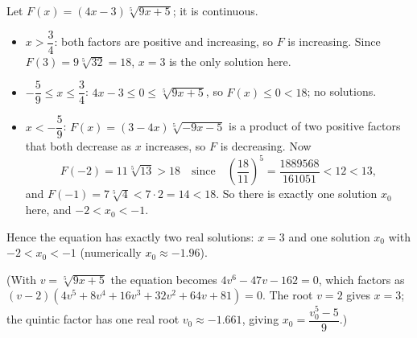 Let $F(x)=(4x-3)\sqrt[5]{9x+5}$; it is continuous.
\begin{itemize}
\item $x>\dfrac34$: both factors are positive and increasing, so $F$ is increasing. Since $F(3)=9\sqrt[5]{32}=18$, $x=3$ is the only solution here.
\item $-\dfrac59\le x\le\dfrac34$: $4x-3\le0\le\sqrt[5]{9x+5}$, so $F(x)\le0<18$; no solutions.
\item $x<-\dfrac59$: $F(x)=(3-4x)\sqrt[5]{-9x-5}$ is a product of two positive factors that both decrease as $x$ increases, so $F$ is decreasing. Now
\[F(-2)=11\sqrt[5]{13}>18\quad\text{since}\quad\left(\dfrac{18}{11}\right)^5=\dfrac{1889568}{161051}<12<13,\]
and $F(-1)=7\sqrt[5]4<7\cdot2=14<18$. So there is exactly one solution $x_0$ here, and $-2<x_0<-1$.
\end{itemize}
Hence the equation has exactly two real solutions: $\boxed{x=3}$ and one solution $x_0$ with $\boxed{-2<x_0<-1}$ (numerically $x_0\approx-1.96$).

(With $v=\sqrt[5]{9x+5}$ the equation becomes $4v^6-47v-162=0$, which factors as $(v-2)(4v^5+8v^4+16v^3+32v^2+64v+81)=0$. The root $v=2$ gives $x=3$; the quintic factor has one real root $v_0\approx-1.661$, giving $x_0=\dfrac{v_0^5-5}{9}$.)
